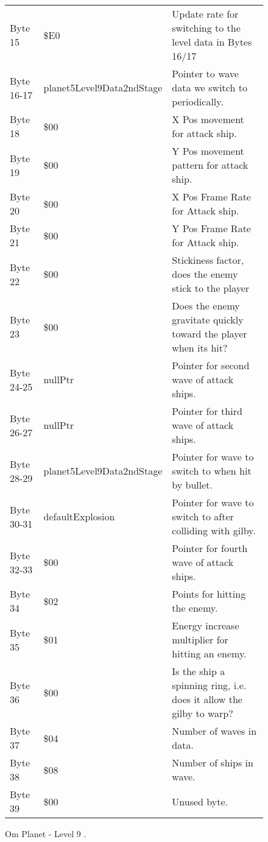 \begin{figure}[H]
{\begin{adjustbox}{width=12cm}
\begin{tabular}{lll}
 Byte 15    & \$E0                       & Update rate for switching to the level data in Bytes 16/17          \\
 Byte 16-17 & planet5Level9Data2ndStage & Pointer to wave data we switch to periodically.                     \\
 Byte 18    & \$00                       & X Pos movement for attack ship.                                     \\
 Byte 19    & \$00                       & Y Pos movement pattern for attack ship.                             \\
 Byte 20    & \$00                       & X Pos Frame Rate for Attack ship.                                   \\
 Byte 21    & \$00                       & Y Pos Frame Rate for Attack ship.                                   \\
 Byte 22    & \$00                       & Stickiness factor, does the enemy stick to the player               \\
 Byte 23    & \$00                       & Does the enemy gravitate quickly toward the player when its hit?    \\
 Byte 24-25 & nullPtr                   & Pointer for second wave of attack ships.                            \\
 Byte 26-27 & nullPtr                   & Pointer for third wave of attack ships.                             \\
 Byte 28-29 & planet5Level9Data2ndStage & Pointer for wave to switch to when hit by bullet.                   \\
 Byte 30-31 & defaultExplosion          & Pointer for  wave to switch to after colliding with gilby.          \\
 Byte 32-33 & \$00                       & Pointer for fourth wave of attack ships.                            \\
 Byte 34    & \$02                       & Points for hitting the enemy.                                       \\
 Byte 35    & \$01                       & Energy increase multiplier for hitting an enemy.                    \\
 Byte 36    & \$00                       & Is the ship a spinning ring, i.e. does it allow the gilby to warp?  \\
 Byte 37    & \$04                       & Number of waves in data.                                            \\
 Byte 38    & \$08                       & Number of ships in wave.                                            \\
 Byte 39    & \$00                       & Unused byte.                                                        \\
\bottomrule
\end{tabular}

  \end{adjustbox}

  }\caption*{Om Planet - Level 9
.}
\end{figure}

